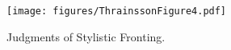 \documentclass[output=paper]{LSP/langsci}
\begin{document}
\begin{figure}
\texttt{[image: figures/ThrainssonFigure4.pdf]}
\caption{Judgments of Stylistic Fronting.
\label{fig:Thrainsson:2}}
\end{figure}
\largerpage[-2]
\end{document}
